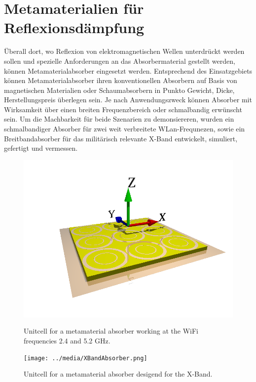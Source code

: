 \documentclass[a4paper,12pt]{scrartcl}  %
\begin{document}
\section{Metamaterialien für Reflexionsdämpfung}
Überall dort, wo Reflexion von elektromagnetischen Wellen unterdrückt werden sollen
und spezielle Anforderungen an das Absorbermaterial gestellt werden, können 
Metamaterialabsorber eingesetzt werden. 
Entsprechend des Einsatzgebiets können Metamaterialabsorber ihren konventionellen
Absorbern auf Basis von magnetischen Materialien oder Schaumabsorbern in Punkto Gewicht, Dicke, Herstellungspreis überlegen sein. Je nach Anwendungszweck können Absorber mit
Wirksamkeit über einen breiten Frequenzbereich oder schmalbandig erwünscht sein. 
Um die Machbarkeit für beide Szenarien zu demonsiereren, wurden ein schmalbandiger Absorber für zwei weit verbreitete WLan-Frequnezen, sowie ein Breitbandabsorber für das militärisch relevante X-Band entwickelt, simuliert, gefertigt und vermessen.

\begin{figure}
\centering
\begin{minipage}[b]{0.5\textwidth}
\includegraphics[scale=0.3]{../media/double_rings.png}
\caption{Unitcell for a metamaterial absorber working at the WiFi frequencies 2.4 and 5.2 GHz.}
\label{fig:Wifi}
\hspace{55pt}
\end{minipage}
\begin{minipage}[b]{0.4\textwidth}
\texttt{[image: ../media/XBandAbsorber.png]}
\caption{Unitcell for a metamaterial absorber desigend for the X-Band.}
\label{fig:XBand}
\end{minipage}
\end{figure}




\newpage



\printbibliography
\end{document}
